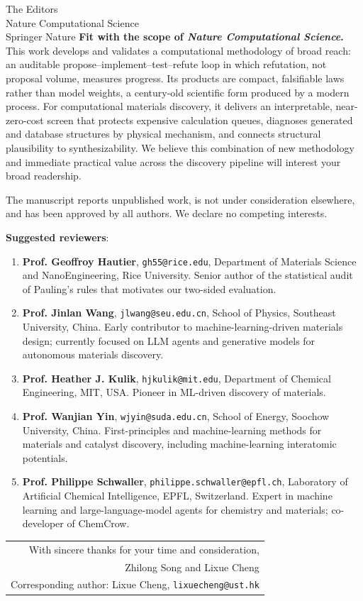 \documentclass[11pt,a4paper]{letter}
\begin{document}
\begin{letter}{The Editors\\Nature Computational Science\\Springer Nature}
\textbf{Fit with the scope of \emph{Nature Computational Science}.}
This work develops and validates a computational methodology of broad reach: an auditable propose--implement--test--refute loop in which refutation, not proposal volume, measures progress. Its products are compact, falsifiable laws rather than model weights, a century-old scientific form produced by a modern process. For computational materials discovery, it delivers an interpretable, near-zero-cost screen that protects expensive calculation queues, diagnoses generated and database structures by physical mechanism, and connects structural plausibility to synthesizability. We believe this combination of new methodology and immediate practical value across the discovery pipeline will interest your broad readership.

The manuscript reports unpublished work, is not under consideration elsewhere, and has been approved by all authors. We declare no competing interests.

\textbf{Suggested reviewers}:

\begin{enumerate}\itemsep0pt
\item \textbf{Prof. Geoffroy Hautier}, \texttt{gh55@rice.edu}, Department of Materials Science and NanoEngineering, Rice University. Senior author of the statistical audit of Pauling's rules that motivates our two-sided evaluation.
\item \textbf{Prof. Jinlan Wang}, \texttt{jlwang@seu.edu.cn}, School of Physics, Southeast University, China. Early contributor to machine-learning-driven materials design; currently focused on LLM agents and generative models for autonomous materials discovery.
\item \textbf{Prof. Heather J. Kulik}, \texttt{hjkulik@mit.edu},
Department of Chemical Engineering, MIT, USA. Pioneer in ML-driven discovery of materials.
\item \textbf{Prof. Wanjian Yin}, \texttt{wjyin@suda.edu.cn},
School of Energy, Soochow University, China. First-principles and machine-learning methods for materials and catalyst discovery, including machine-learning interatomic potentials.
\item \textbf{Prof. Philippe Schwaller}, \texttt{philippe.schwaller@epfl.ch}, Laboratory of Artificial Chemical Intelligence, EPFL, Switzerland. Expert in machine learning and large-language-model agents for chemistry and materials; co-developer of ChemCrow.
\end{enumerate}


\vspace{0.2em}
\noindent\hfill\begin{tabular}{@{}r@{}}
With sincere thanks for your time and consideration,\\[2.0em]
Zhilong Song and Lixue Cheng\\
{\footnotesize Corresponding author: Lixue Cheng, \texttt{lixuecheng@ust.hk}}
\end{tabular}

\end{letter}
\end{document}
